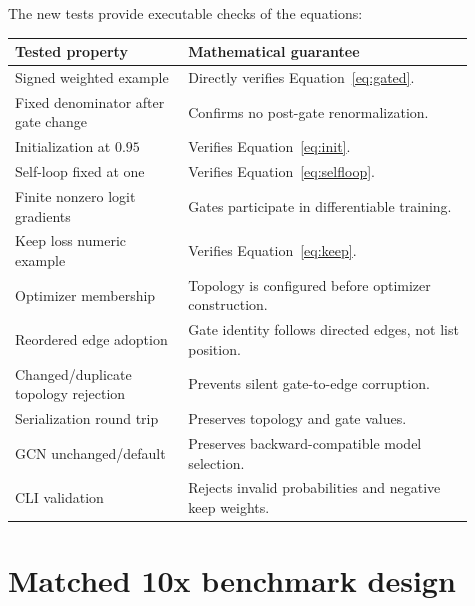 \documentclass[11pt]{article}
\begin{document}
The new tests provide executable checks of the equations:
\begin{longtable}{p{0.34\linewidth}p{0.57\linewidth}}
\toprule
Tested property & Mathematical guarantee \\
\midrule
\endhead
Signed weighted example & Directly verifies Equation~\eqref{eq:gated}. \\
Fixed denominator after gate change & Confirms no post-gate renormalization. \\
Initialization at $0.95$ & Verifies Equation~\eqref{eq:init}. \\
Self-loop fixed at one & Verifies Equation~\eqref{eq:selfloop}. \\
Finite nonzero logit gradients & Gates participate in differentiable training. \\
Keep loss numeric example & Verifies Equation~\eqref{eq:keep}. \\
Optimizer membership & Topology is configured before optimizer construction. \\
Reordered edge adoption & Gate identity follows directed edges, not list position. \\
Changed/duplicate topology rejection & Prevents silent gate-to-edge corruption. \\
Serialization round trip & Preserves topology and gate values. \\
GCN unchanged/default & Preserves backward-compatible model selection. \\
CLI validation & Rejects invalid probabilities and negative keep weights. \\
\bottomrule
\end{longtable}

\section{Matched 10x benchmark design}
\end{document}
